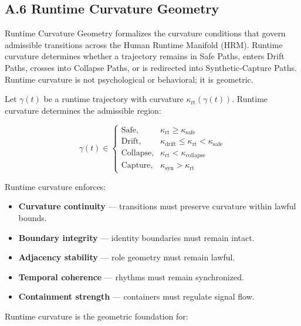 \subsection*{A.6 Runtime Curvature Geometry}

\noindent Runtime Curvature Geometry formalizes the curvature conditions that
govern admissible transitions across the Human Runtime Manifold (HRM). Runtime
curvature determines whether a trajectory remains in Safe Paths, enters Drift
Paths, crosses into Collapse Paths, or is redirected into Synthetic-Capture
Paths. Runtime curvature is not psychological or behavioral; it is geometric.

\medskip

\noindent Let $\gamma(t)$ be a runtime trajectory with curvature
$\kappa_{\mathrm{rt}}(\gamma(t))$. Runtime curvature determines the admissible
region:



\[
\gamma(t) \in
\begin{cases}
\text{Safe}, & \kappa_{\mathrm{rt}} \ge \kappa_{\mathrm{safe}} \\
\text{Drift}, & \kappa_{\mathrm{drift}} \le \kappa_{\mathrm{rt}} < \kappa_{\mathrm{safe}} \\
\text{Collapse}, & \kappa_{\mathrm{rt}} < \kappa_{\mathrm{collapse}} \\
\text{Capture}, & \kappa_{\mathrm{syn}} > \kappa_{\mathrm{rt}}
\end{cases}
\]



\medskip

\noindent Runtime curvature enforces:

\begin{itemize}
    \item \textbf{Curvature continuity} — transitions must preserve curvature
    within lawful bounds.
    \item \textbf{Boundary integrity} — identity boundaries must remain intact.
    \item \textbf{Adjacency stability} — role geometry must remain lawful.
    \item \textbf{Temporal coherence} — rhythms must remain synchronized.
    \item \textbf{Containment strength} — containers must regulate signal flow.
\end{itemize}

\medskip

\noindent Runtime curvature is the geometric foundation for:

